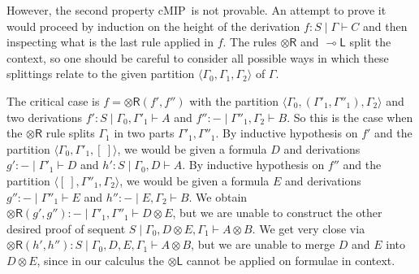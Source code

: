 \documentclass[sn-mathphys-num]{sn-jnl}%
\newcommand{\GG}{\Gamma}
\newcommand{\vd}{\vdash}
\newcommand{\tl}{\otimes \mathsf{L}}
\newcommand{\tr}{\otimes\mathsf{R}}
\newcommand{\ot}{\otimes}
\newcommand{\lolli}{\multimap}
\newcommand{\lleft}{{\lolli}\mathsf{L}}
\newcommand{\cMIP}{\textsf{cMIP}}
\theoremstyle{thmstyleone}%
\theoremstyle{thmstyletwo}%
\theoremstyle{thmstylethree}%
\begin{document}
However, the second property \cMIP~is not provable. An attempt to prove it would proceed by induction on the height of the derivation $f : S \mid \GG \vdash C$ and then inspecting what is the last rule applied in $f$. The rules $\tr$ and $\lleft$ split the context, so one should be careful to consider all possible ways in which these splittings relate to the given partition $\langle \GG_0,\GG_1, \GG_2 \rangle$ of $\GG$.

The critical case is $f = \tr (f',f'')$ with the partition $\langle \GG_0, (\GG'_1, \GG''_1), \GG_2\rangle$ and two derivations $f' : S \mid \GG_0 , \GG'_1 \vd A$ and $f'' : {-} \mid \GG''_1 , \GG_2 \vd B$. So this is the case when the $\tr$ rule splits $\GG_1$ in two parts $\GG'_1,\GG''_1$.
By inductive hypothesis on $f'$ and the partition $\langle \GG_0 , \GG'_1, [\ ] \rangle$, we would be given a formula $D$ and derivations $g' : {-} \mid \GG'_1 \vd D$ and $h': S \mid \GG_0 , D \vd A$. By inductive hypothesis on $f''$ and the partition $\langle [\ ], \GG''_1, \GG_2\rangle$, we would be given a formula $E$ and derivations $g'' : {-} \mid \GG''_1 \vd E$ and $h'': {-} \mid E, \GG_2 \vd B$.
We obtain $\tr (g',g'') : {-} \mid \GG'_1, \GG''_1 \vd D \ot E$, but we are unable to construct the other desired proof of sequent $S \mid \GG_0, D \ot E, \GG_1 \vd A \ot B$. We get very close via $\tr (h', h'') : S \mid \GG_0, D, E, \GG_1 \vd A \ot B$, but we are unable to merge $D$ and $E$ into $D \ot E$, since in our calculus the $\tl$ cannot be applied on formulae in context.
\end{document}
